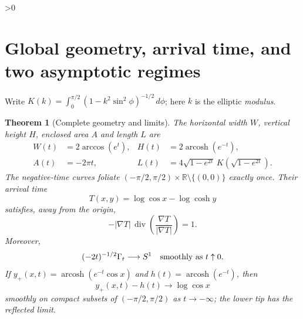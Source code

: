 \documentclass[10pt]{article}
\providecommand{\CRevisionRound}{2}
\newtheorem{theorem}{Theorem}
\newcommand{\arcosh}{\operatorname{arcosh}}
\newcommand{\diver}{\operatorname{div}}
\begin{document}
\ifnum\CRevisionRound>0
\section{Global geometry, arrival time, and two asymptotic regimes}
Write $K(k)=\int_0^{\pi/2}(1-k^2\sin^2\phi)^{-1/2}\,d\phi$; here $k$ is
the elliptic \emph{modulus}.
\begin{theorem}[Complete geometry and limits]\label{thm:global}
The horizontal width $W$, vertical height $H$, enclosed area $A$ and length
$L$ are
\begin{align}
 W(t)&=2\arccos(e^t),& H(t)&=2\arcosh(e^{-t}),\label{eq:spans}\\
 A(t)&=-2\pi t,&
 L(t)&=4\sqrt{1-e^{2t}}\,
 K\!\left(\sqrt{1-e^{2t}}\right).\label{eq:area-length}
\end{align}
The negative-time curves foliate
$(-\pi/2,\pi/2)\times\mathbb R\setminus\{(0,0)\}$ exactly once.  Their
arrival time
\begin{equation}\label{eq:arrival}
 T(x,y)=\log\cos x-\log\cosh y
\end{equation}
satisfies, away from the origin,
\begin{equation}\label{eq:arrival-pde}
 -|\nabla T|\,\diver\!\left(\frac{\nabla T}{|\nabla T|}\right)=1.
\end{equation}
Moreover,
\[
 (-2t)^{-1/2}\Gamma_t\longrightarrow S^1
 \quad\hbox{smoothly as }t\uparrow0.
\]
If $y_+(x,t)=\arcosh(e^{-t}\cos x)$ and
$h(t)=\arcosh(e^{-t})$, then
\begin{equation}\label{eq:grim}
 y_+(x,t)-h(t)\longrightarrow\log\cos x
\end{equation}
smoothly on compact subsets of $(-\pi/2,\pi/2)$ as $t\to-\infty$; the
lower tip has the reflected limit.
\end{theorem}
\end{document}

